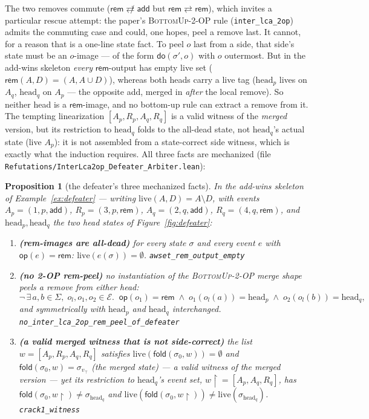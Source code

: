 \documentclass[11pt]{article}
\newtheorem{proposition}[theorem]{Proposition}
\newcommand{\comm}{\rightleftarrows}
\newcommand{\ncomm}{\not\rightleftarrows}
\newcommand{\add}{\mathsf{add}}
\newcommand{\rem}{\mathsf{rem}}
\newcommand{\Sinit}{\sigma_0}
\newcommand{\lean}[1]{\texttt{#1}}
\newcommand{\M}[1]{\mathcal{#1}}
\newcommand{\fold}{\mathsf{fold}}
\begin{document}
The two removes commute ($\rem \ncomm \add$ but $\rem \comm \rem$), which
invites a particular rescue attempt: the paper's \textsc{BottomUp-2-OP}
rule (\lean{inter\_lca\_2op}) admits the commuting case and could, one
hopes, peel a remove last. It cannot, for a reason that is a one-line
state fact. To peel $o$ last from a side, that side's state must be an
$o$-image --- of the form $\mathsf{do}(\sigma', o)$ with $o$ outermost.
But in the add-wins skeleton \emph{every} $\rem$-output has empty live set
($\rem(A,D) = (A, A\cup D)$), whereas both heads carry a live tag
($\mathrm{head}_p$ lives on $A_q$, $\mathrm{head}_q$ on $A_p$ --- the
opposite add, merged in \emph{after} the local remove). So neither head
is a $\rem$-image, and no bottom-up rule can extract a remove from it. The
tempting linearization $[A_p, R_p, A_q, R_q]$ is a valid witness of the
\emph{merged} version, but its restriction to $\mathrm{head}_q$ folds to
the all-dead state, not $\mathrm{head}_q$'s actual state (live $A_p$): it
is not assembled from a state-correct side witness, which is exactly what
the induction requires. All three facts are mechanized
(file \lean{Refutations/InterLca2op\_Defeater\_Arbiter.lean}):

\begin{proposition}[the defeater's three mechanized facts]
\label{prop:defeater}
In the add-wins skeleton of Example~\ref{ex:defeater} --- writing
$\mathrm{live}(A,D) = A \setminus D$, with events
$A_p = (1,p,\add)$, $R_p = (3,p,\rem)$, $A_q = (2,q,\add)$,
$R_q = (4,q,\rem)$, and $\mathrm{head}_p, \mathrm{head}_q$ the two head
states of Figure~\ref{fig:defeater}:
\begin{enumerate}[leftmargin=2.2em]
\item \textbf{(rem-images are all-dead)} for every state $\sigma$ and
  every event $e$ with $\mathsf{op}(e) = \rem$:
  $\mathrm{live}(e(\sigma)) = \emptyset$.
  \hfill\lean{awset\_rem\_output\_empty}
\item \textbf{(no 2-OP rem-peel)} no instantiation of the
  \textsc{BottomUp-2-OP} merge shape peels a remove from either head:
  \[
    \neg\, \exists\, a, b \in \Sigma,\; o_l, o_1, o_2 \in \M{E}.\;\;
    \mathsf{op}(o_1) = \rem \;\wedge\;
    o_1(o_l(a)) = \mathrm{head}_p \;\wedge\;
    o_2(o_l(b)) = \mathrm{head}_q ,
  \]
  and symmetrically with $\mathrm{head}_p$ and $\mathrm{head}_q$
  interchanged.
  \hfill\lean{no\_inter\_lca\_2op\_rem\_peel\_of\_defeater}
\item \textbf{(a valid merged witness that is not side-correct)} the
  list $w = [A_p, R_p, A_q, R_q]$ satisfies
  $\mathrm{live}(\fold(\Sinit, w)) = \emptyset$ and
  $\fold(\Sinit, w) = \sigma_{v_\top}$ (the merged state) --- a valid
  witness of the merged version --- yet its restriction to
  $\mathrm{head}_q$'s event set,
  $w{\restriction} = [A_p, A_q, R_q]$, has
  $\fold(\Sinit, w{\restriction}) \neq \sigma_{\mathrm{head}_q}$ and
  $\mathrm{live}(\fold(\Sinit, w{\restriction})) \neq
  \mathrm{live}(\sigma_{\mathrm{head}_q})$.
  \hfill\lean{crack1\_witness}
\end{enumerate}
\end{proposition}
\end{document}
